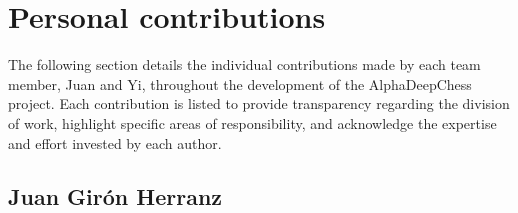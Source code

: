 \chapter*{Personal contributions}
\label{cap:contribucionesPersonales}

The following section details the individual contributions made by each team member, Juan and Yi, throughout the development of the AlphaDeepChess project. Each contribution is listed to provide transparency regarding the division of work, highlight specific areas of responsibility, and acknowledge the expertise and effort invested by each author.

\section*{Juan Girón Herranz}

